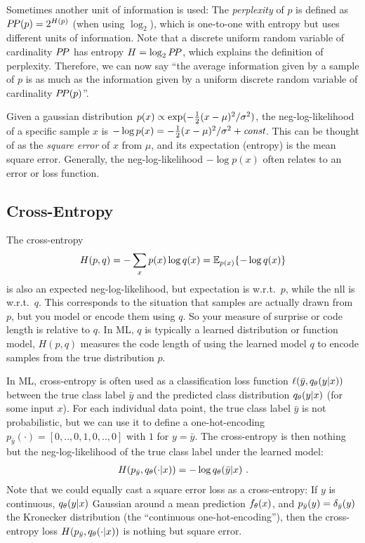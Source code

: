 \newcommand{\per}{P\kern-1.5ptP}

Sometimes another unit of information is used: The \emph{perplexity}
of $p$ is defined as $\per(p) = 2^{H(p)}$ (when using $\log_2$), which
is one-to-one with entropy but uses different units of
information. Note that a discrete uniform random variable of
cardinality $\per$ has entropy $H = \log_2 \per$, which explains the
definition of perplexity. Therefore, we can now say ``the average
information given by a sample of $p$ is as much as the information
given by a uniform discrete random variable of cardinality
$\per(p)$''.

Given a gaussian distribution $p(x) \propto \exp( -\half(x-\mu)^2/\s^2 )$, the neg-log-likelihood of a specific sample $x$ is $-\log p(x) = -\half (x-\mu)^2/\s^2 + \textit{const}$. This can be thought of as the \emph{square error} of $x$ from $\mu$, and its expectation (entropy) is the mean square error. Generally, the neg-log-likelihood $-\log p(x)$ often relates to an error or loss function.

\subsection{Cross-Entropy}

The cross-entropy
\begin{align}
H(p,q) = - \sum_x p(x) \log q(x) = \Exp[p(x)]{-\log q(x)}
\end{align}
is also an expected neg-log-likelihood, but expectation is w.r.t.\ $p$, while the nll is w.r.t.\ $q$. This corresponds to the situation that samples are actually drawn from $p$, but you model or encode them using $q$. So your measure of surprise or code length is relative to $q$. In ML, $q$ is typically a learned distribution or function model, $H(p,q)$ measures the code length of using the learned model $q$ to encode samples from the true distribution $p$.

In ML, cross-entropy is often used as a classification loss function $\ell(\bar y, q_\t(y|x))$ between the true class label $\bar y$ and the predicted class distribution $q_\t(y|x)$ (for some input $x$). For each individual data point, the true class label $\bar y$ is not probabilistic, but we can use it to define a one-hot-encoding $p_{\bar y}(\cdot) = [0,..,0,1,0,..,0]$ with $1$ for $y=\bar y$. The cross-entropy is then nothing but the neg-log-likelihood of the true class label under the learned model:
\begin{align}
H(p_{\bar y}, q_\t(\cdot|x)) = - \log q_\t(\bar y|x) ~.
\end{align}
Note that we could equally cast a square error loss as a cross-entropy: If $y$ is continuous, $q_\t(y|x)$ Gaussian around a mean prediction $f_\t(x)$, and $p_{\bar y}(y) = \d_{\bar y}(y)$ the Kronecker distribution (the ``continuous one-hot-encoding''), then the cross-entropy loss $H(p_{\bar y}, q_\t(\cdot|x))$ is nothing but square error.

